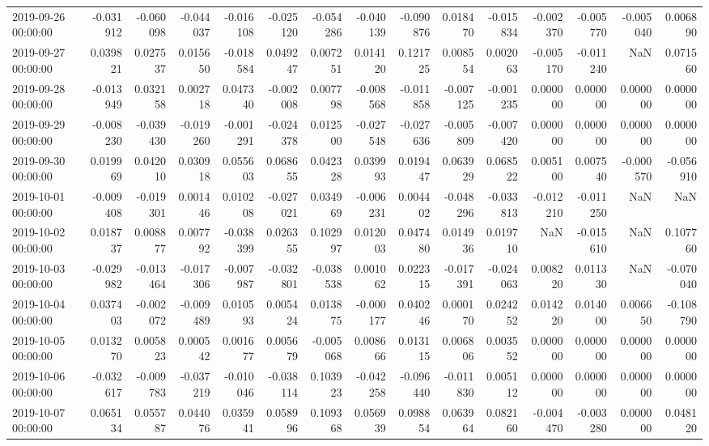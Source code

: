 \begin{tabular}{lrrrrrrrrrrrrrr}
2019-09-26 00:00:00 & -0.031912 & -0.060098 & -0.044037 & -0.016108 & -0.025120 & -0.054286 & -0.040139 & -0.090876 & 0.018470 & -0.015834 & -0.002370 & -0.005770 & -0.005040 & 0.006890 \\
2019-09-27 00:00:00 & 0.039821 & 0.027537 & 0.015650 & -0.018584 & 0.049247 & 0.007251 & 0.014120 & 0.121725 & 0.008554 & 0.002063 & -0.005170 & -0.011240 & NaN & 0.071560 \\
2019-09-28 00:00:00 & -0.013949 & 0.032158 & 0.002718 & 0.047340 & -0.002008 & 0.007798 & -0.008568 & -0.011858 & -0.007125 & -0.001235 & 0.000000 & 0.000000 & 0.000000 & 0.000000 \\
2019-09-29 00:00:00 & -0.008230 & -0.039430 & -0.019260 & -0.001291 & -0.024378 & 0.012500 & -0.027548 & -0.027636 & -0.005809 & -0.007420 & 0.000000 & 0.000000 & 0.000000 & 0.000000 \\
2019-09-30 00:00:00 & 0.019969 & 0.042010 & 0.030918 & 0.055603 & 0.068655 & 0.042328 & 0.039993 & 0.019447 & 0.063929 & 0.068522 & 0.005100 & 0.007540 & -0.000570 & -0.056910 \\
2019-10-01 00:00:00 & -0.009408 & -0.019301 & 0.001446 & 0.010208 & -0.027021 & 0.034969 & -0.006231 & 0.004402 & -0.048296 & -0.033813 & -0.012210 & -0.011250 & NaN & NaN \\
2019-10-02 00:00:00 & 0.018737 & 0.008877 & 0.007792 & -0.038399 & 0.026355 & 0.102997 & 0.012003 & 0.047480 & 0.014936 & 0.019710 & NaN & -0.015610 & NaN & 0.107760 \\
2019-10-03 00:00:00 & -0.029982 & -0.013464 & -0.017306 & -0.007987 & -0.032801 & -0.038538 & 0.001062 & 0.022315 & -0.017391 & -0.024063 & 0.008220 & 0.011330 & NaN & -0.070040 \\
2019-10-04 00:00:00 & 0.037403 & -0.002072 & -0.009489 & 0.010593 & 0.005424 & 0.013875 & -0.000177 & 0.040246 & 0.000170 & 0.024252 & 0.014220 & 0.014000 & 0.006650 & -0.108790 \\
2019-10-05 00:00:00 & 0.013270 & 0.005823 & 0.000542 & 0.001677 & 0.005679 & -0.005068 & 0.008666 & 0.013115 & 0.006806 & 0.003552 & 0.000000 & 0.000000 & 0.000000 & 0.000000 \\
2019-10-06 00:00:00 & -0.032617 & -0.009783 & -0.037219 & -0.010046 & -0.038114 & 0.103923 & -0.042258 & -0.096440 & -0.011830 & 0.005112 & 0.000000 & 0.000000 & 0.000000 & 0.000000 \\
2019-10-07 00:00:00 & 0.065134 & 0.055787 & 0.044076 & 0.035941 & 0.058996 & 0.109368 & 0.056939 & 0.098854 & 0.063964 & 0.082160 & -0.004470 & -0.003280 & 0.000000 & 0.048120 \\

\end{tabular}
